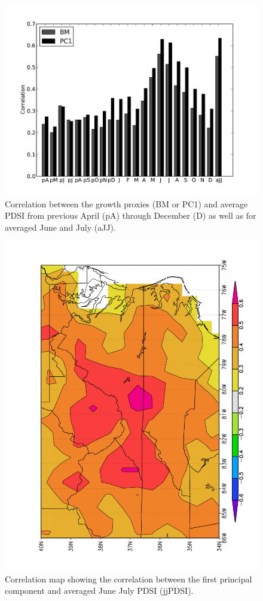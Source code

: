 \begin{figure}
\centering
\includegraphics[width=6in]{figures/climCorrPdsi.pdf}
\caption{Correlation between the growth proxies (BM or PC1) and average PDSI from previous April (pA) through December (D) as well as for averaged June and July (aJJ).}
\label{fig:pdsiBarCorr}
\end{figure}

\begin{figure}
\centering
\includegraphics[width=5in, angle=-90]{figures/corrMapPrecipMJ.pdf}
\caption{Correlation map showing the correlation between the first principal component and averaged June July PDSI (jjPDSI).}
\label{fig:precipCorrMap}
\end{figure}

